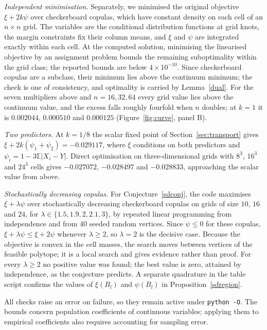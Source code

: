 \documentclass[11pt,a4paper]{article}
\theoremstyle{remark}
\newcommand{\E}{\mathbb E}
\newcommand{\1}{\mathbf 1}
\begin{document}
\emph{Independent minimisation.} Separately, we minimised the original objective $\xi+2k\psi$ over checkerboard copulas, which have constant density on each cell of an $n\times n$ grid. The variables are the conditional distribution functions at grid knots, the margin constraints fix their column means, and $\xi$ and $\psi$ are integrated exactly within each cell. At the computed solution, minimising the linearised objective by an assignment problem bounds the remaining suboptimality within the grid class; the reported bounds are below $4\times10^{-10}$. Since checkerboard copulas are a subclass, their minimum lies above the continuum minimum; the check is one of consistency, and optimality is carried by Lemma~\ref{dual}. For the seven multipliers above and $n=16,32,64$ every grid value lies above the continuum value, and the excess falls roughly fourfold when $n$ doubles; at $k=1$ it is $0.002044$, $0.000510$ and $0.000125$ (Figure~\ref{fig:curve}, panel B).

\emph{Two predictors.} At $k=1/8$ the scalar fixed point of Section~\ref{sec:transport} gives $\xi+2k(\psi_1+\psi_2)=-0.029117$, where $\xi$ conditions on both predictors and $\psi_i=1-3\E|X_i-Y|$. Direct optimisation on three-dimensional grids with $8^3$, $16^3$ and $24^3$ cells gives $-0.027072$, $-0.028497$ and $-0.028833$, approaching the scalar value from above.

\emph{Stochastically decreasing copulas.} For Conjecture~\ref{sdconj}, the code maximises $\xi+\lambda\psi$ over stochastically decreasing checkerboard copulas on grids of size $10$, $16$ and $24$, for $\lambda\in\{1.5,1.9,2,2.1,3\}$, by repeated linear programming from independence and from 40 seeded random vertices. Since $\psi\le0$ for these copulas, $\xi+\lambda\psi\le\xi+2\psi$ whenever $\lambda\ge2$, so $\lambda=2$ is the decisive case. Because the objective is convex in the cell masses, the search moves between vertices of the feasible polytope; it is a local search and gives evidence rather than proof. For every $\lambda\ge2$ no positive value was found; the best value is zero, attained by independence, as the conjecture predicts. A separate quadrature in the table script confirms the values of $\xi(B_l)$ and $\psi(B_l)$ in Proposition~\ref{sdregion}.

All checks raise an error on failure, so they remain active under \texttt{python -O}. The bounds concern population coefficients of continuous variables; applying them to empirical coefficients also requires accounting for sampling error.
\end{document}
